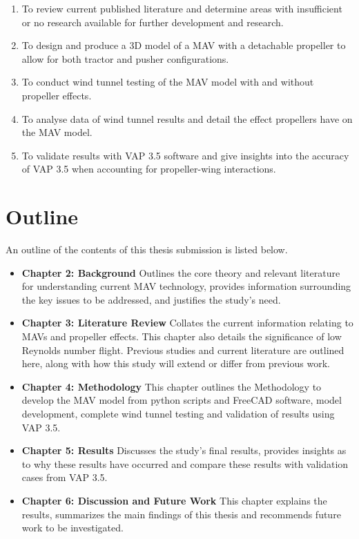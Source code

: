 \begin{enumerate}
   \item To review current published literature and determine areas with insufficient or no research available for further development and research.
  \item To design and produce a 3D model of a \acrshort{MAV} with a detachable propeller to allow for both tractor and pusher configurations.
  \item To conduct wind tunnel testing of the \acrshort{MAV} model with and without propeller effects.
  \item To analyse data of wind tunnel results and detail the effect propellers have on the \acrshort{MAV} model.
  \item To validate results with VAP 3.5 software and give insights into the accuracy of VAP 3.5 when accounting for propeller-wing interactions. 
\end{enumerate}

\section{Outline}
\label{sec:Outline}
An outline of the contents of this thesis submission is listed below. 

\begin{itemize}
  \item \textbf{Chapter 2: Background }\newline  Outlines the core theory and relevant literature for understanding current \acrshort{MAV} technology, provides information surrounding the key issues to be addressed, and justifies the study's need. 
  \item \textbf{Chapter 3: Literature Review} \newline
  Collates the current information relating to \acrshort{MAV}s and propeller effects. This chapter also details the significance of low Reynolds number flight. Previous studies and current literature are outlined here, along with how this study will extend or differ from previous work.
  \item \textbf{Chapter 4: Methodology} \newline This chapter outlines the Methodology to develop the \acrshort{MAV} model from python scripts and FreeCAD software, model development, complete wind tunnel testing and validation of results using VAP 3.5.
  \item \textbf{Chapter 5: Results} \newline Discusses the study's final results, provides insights as to why these results have occurred and compare these results with validation cases from VAP 3.5.
  \item \textbf{Chapter 6: Discussion and Future Work} \newline This chapter explains the results, summarizes the main findings of this thesis and recommends future work to be investigated. 
\end{itemize}






